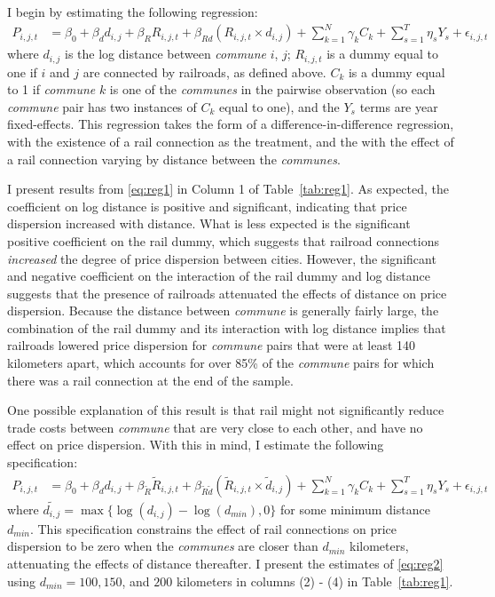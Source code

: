 \documentclass[12pt,twoside]{article}
\begin{document}
I begin by estimating the following regression:
\begin{align}
	P_{i,j,t} &= \beta_0 + \beta_d d_{i,j} + \beta_R R_{i,j,t} + \beta_{Rd} (R_{i,j,t} \times d_{i,j}) + \sum_{k=1}^{N} \gamma_k C_k + \sum_{s=1}^{T} \eta_s Y_s + \epsilon_{i,j,t} \label{eq:reg1}
\end{align}
where $d_{i,j}$ is the log distance between \emph{commune} $i$, $j$; $R_{i,j,t}$ is a dummy equal to one if $i$ and $j$ are connected by railroads, as defined above.
$C_k$ is a dummy equal to 1 if \emph{commune} $k$ is one of the \emph{communes} in the pairwise observation (so each \emph{commune} pair has two instances of $C_k$ equal to one), and the $Y_s$ terms are year fixed-effects.
This regression takes the form of a difference-in-difference regression, with the existence of a rail connection as the treatment, and the with the effect of a rail connection varying by distance between the \emph{communes}.

I present results from \eqref{eq:reg1} in Column 1 of Table~\ref{tab:reg1}.
As expected, the coefficient on log distance is positive and significant, indicating that price dispersion increased with distance.
What is less expected is the significant positive coefficient on the rail dummy, which suggests that railroad connections \emph{increased} the degree of price dispersion between cities.
However, the significant and negative coefficient on the interaction of the rail dummy and log distance suggests that the presence of railroads attenuated the effects of distance on price dispersion.
Because the distance between \emph{commune} is generally fairly large, the combination of the rail dummy and its interaction with log distance implies that railroads lowered price dispersion for \emph{commune} pairs that were at least 140 kilometers apart, which accounts for over 85\% of the \emph{commune} pairs for which there was a rail connection at the end of the sample.

\begin{landscape}
	
\end{landscape}

One possible explanation of this result is that rail might not significantly reduce trade costs between \emph{commune} that are very close to each other, and have no effect on price dispersion.
With this in mind, I estimate the following specification:
\begin{align}
	P_{i,j,t} &= \beta_0 + \beta_d d_{i,j} + \beta_{\tilde{R}} \tilde{R}_{i,j,t} + \beta_{\tilde{R}\tilde{d}} (\tilde{R}_{i,j,t} \times \tilde{d}_{i,j}) + \sum_{k=1}^{N} \gamma_k C_k + \sum_{s=1}^{T} \eta_s Y_s + \epsilon_{i,j,t} \label{eq:reg2}
\end{align}
where $\tilde{d_{i,j}} = \max\{ \log( d_{i,j} ) - \log( d_{min} ), 0 \}$ for some minimum distance $d_{min}$.
This specification constrains the effect of rail connections on price dispersion to be zero when the \emph{communes} are closer than $d_{min}$ kilometers, attenuating the effects of distance thereafter.
I present the estimates of \eqref{eq:reg2} using $d_{min} = 100, 150$, and $200$ kilometers in columns (2) - (4) in Table~\ref{tab:reg1}.
\end{document}
